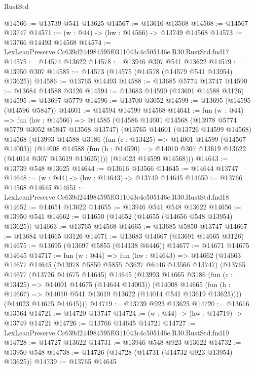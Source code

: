 \begin{lexlean}{RustStd}
\begin{coremodule}
@14566 := @13739 @541 @13625
@14567 := @13616 @13568
@14568 := @14567 @13747
@14571 := (w : @44) -> (hw : @14566) -> @13749 @14568
@14573 := @13766 @14493 @14568
@14574 := LexLeanPreserve.Cc639d244984595f0311043c4c505146e.R30.RustStd.fnd17
@14575 := @14574 @13622
@14578 := @13946 @307 @541 @13622
@14579 := @13950 @307
@14585 := @14573 (@14575 (@14578 (@14579 @541 @13954) @13625))
@14586 := @13765 @14493
@14588 := @13685 @5774 @13747
@14590 := @13684 @14588 @3126
@14594 := @13683 @14590 (@13691 @14588 @3126)
@14595 := @13697 @5779
@14596 := @13700 @3052
@14599 := @13695 (@14595 (@14596 @5847))
@14601 := @14594 @14599 @14568
@14641 := fun (w : @44) =>
  fun (hw : @14566) =>
  @14585
    (@14586
      @14601
      @14568
      (@13978 @5774 @5779 @3052 @5847 @13568 @13747)
      (@13765
        @14601
        (@13726 @14599 @14568)
        @14568
        (@13993
          @14588
          @3186
          (fun (c : @13425) => @14001 @14599 (@14567 @14003))
          (@14008
            @14588
            (fun (h : @14590) => @14010 @307 @13619 @13622 (@14014 @307 @13619 @13625))))
        (@14023 @14599 @14568)))
@14643 := @13739 @548 @13625
@14644 := @13616 @13566
@14645 := @14644 @13747
@14648 := (w : @44) -> (hw : @14643) -> @13749 @14645
@14650 := @13766 @14568 @14645
@14651 := LexLeanPreserve.Cc639d244984595f0311043c4c505146e.R30.RustStd.fnd18
@14652 := @14651 @13622
@14655 := @13946 @541 @548 @13622
@14656 := @13950 @541
@14662 := @14650 (@14652 (@14655 (@14656 @548 @13954) @13625))
@14663 := @13765 @14568
@14665 := @13685 @5850 @13747
@14667 := @13684 @14665 @3126
@14671 := @13683 @14667 (@13691 @14665 @3126)
@14675 := @13695 (@13697 @5855 (@14138 @6446))
@14677 := @14671 @14675 @14645
@14717 := fun (w : @44) =>
  fun (hw : @14643) =>
  @14662
    (@14663
      @14677
      @14645
      (@13978 @5850 @5855 @3627 @6446 @13566 @13747)
      (@13765
        @14677
        (@13726 @14675 @14645)
        @14645
        (@13993
          @14665
          @3186
          (fun (c : @13425) => @14001 @14675 (@14644 @14003))
          (@14008
            @14665
            (fun (h : @14667) => @14010 @541 @13619 @13622 (@14014 @541 @13619 @13625))))
        (@14023 @14675 @14645)))
@14719 := @13739 @923 @13625
@14720 := @13616 @13564
@14721 := @14720 @13747
@14724 := (w : @44) -> (hw : @14719) -> @13749 @14721
@14726 := @13766 @14645 @14721
@14727 := LexLeanPreserve.Cc639d244984595f0311043c4c505146e.R30.RustStd.fnd19
@14728 := @14727 @13622
@14731 := @13946 @548 @923 @13622
@14732 := @13950 @548
@14738 := @14726 (@14728 (@14731 (@14732 @923 @13954) @13625))
@14739 := @13765 @14645

\end{coremodule}
\end{lexlean}
